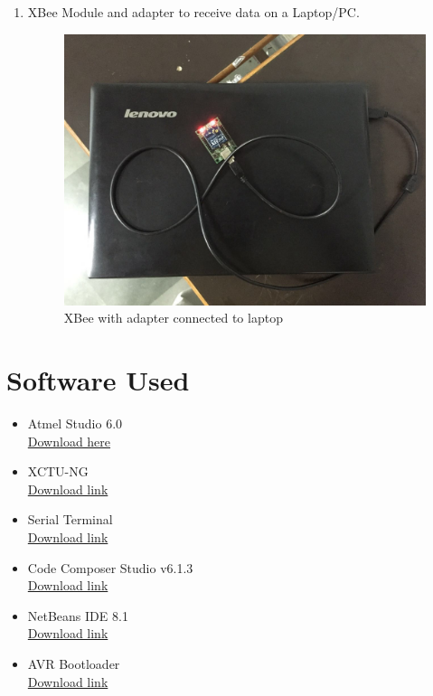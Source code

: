 \documentclass[a4paper,12pt,oneside]{book}
\begin{document}
\begin{itemize}
\begin{enumerate}
    \item XBee Module and adapter to receive data on a Laptop/PC.
    \begin{figure}[h]
        \centering
        \includegraphics[scale=0.12]{adapter_board}
        \caption{XBee with adapter connected to laptop}
      \end{figure}
  \end{enumerate}
\end{itemize}
\newpage
\section{Software Used}
\begin{itemize}
  \item Atmel Studio 6.0\\
  \href{http://www.atmel.com/forms/software-download.aspx?target=tcm:26-41305}{ Download here}
  \item XCTU-NG\\
  \href{http://www.digi.com/products/XBee-rf-solutions/xctu-software/xctu}{ Download link}
  \item Serial Terminal\\
  \href{http://www.nex-robotics.com/images/downloads/Terminal\%20Setup.zip}{Download link}
  \item Code Composer Studio v6.1.3\\
  \href{http://www.ti.com/tool/ccstudio}{Download link}


  \item NetBeans IDE 8.1\\
  \href{https://netbeans.org/downloads/}{Download link}
  \item AVR Bootloader\\
  \href{http://www.nex-robotics.com/images/downloads/AVR\%20Boot\%20Loader.zip}{Download link}
\end{itemize}
\newpage
\end{document}
